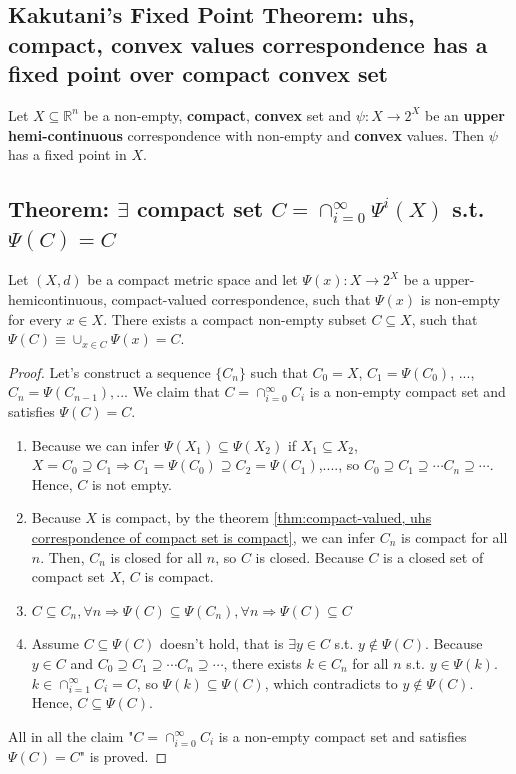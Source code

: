 \documentclass[11pt]{elegantbook}
\begin{document}
\subsection{Kakutani's Fixed Point Theorem: uhs, compact, convex values correspondence has a fixed point over compact convex set}
\begin{theorem}\label{thm:Kakutani's Fixed Point Theorem}
    Let $X \subseteq \mathbb{R}^n$ be a non-empty, \textbf{compact}, \textbf{convex} set and $\psi : X \rightarrow 2^X$ be an \textbf{upper hemi-continuous} correspondence with non-empty and \textbf{convex} values. Then $\psi$ has a fixed point in $X$.
\end{theorem}


\subsection{Theorem: $\exists$ compact set $C = \cap_{i=0}^\infty \Psi^i(X)$ s.t. $\Psi(C)=C$}
\begin{theorem}
    Let $(X, d)$ be a compact metric space and let $\Psi(x) : X \rightarrow 2^X$ be a upper-hemicontinuous, compact-valued correspondence, such that $\Psi(x)$ is non-empty for every $x \in X$. There exists a compact non-empty subset $C\subseteq X$, such that $\Psi(C) \equiv \cup_{x\in C}\Psi(x) = C$.
\end{theorem}
\begin{proof}
    Let's construct a sequence $\{C_n\}$ such that $C_0=X$, $C_1=\Psi(C_0)$, ..., $C_n=\Psi(C_{n-1}),...$ We claim that $C=\cap_{i=0}^\infty C_i$ is a non-empty compact set and satisfies $\Psi(C)=C$.
    \begin{enumerate}
        \item Because we can infer $\Psi(X_1)\subseteq \Psi(X_2)$ if $X_1\subseteq X_2$, $X=C_0\supseteq C_1 \Rightarrow C_1=\Psi(C_0)\supseteq C_2=\Psi(C_1)$,...., so $C_0\supseteq C_1\supseteq \cdots C_n\supseteq \cdots$. Hence, $C$ is not empty.
        \item Because $X$ is compact, by the theorem \ref{thm:compact-valued, uhs correspondence of compact set is compact}, we can infer $C_n$ is compact for all $n$. Then, $C_n$ is closed for all $n$, so $C$ is closed. Because $C$ is a closed set of compact set $X$, $C$ is compact.
        \item $C\subseteq C_n,\forall n \Rightarrow \Psi(C)\subseteq \Psi(C_n),\forall n \Rightarrow \Psi(C)\subseteq C$
        \item Assume $C\subseteq \Psi(C)$ doesn't hold, that is $\exists y\in C$ s.t. $y\notin \Psi(C)$. Because $y\in C$ and $C_0\supseteq C_1\supseteq \cdots C_n\supseteq \cdots$, there exists $k\in C_n$ for all $n$ s.t. $y\in\Psi(k)$. $k\in \cap_{i=1}^\infty C_i=C$, so $\Psi(k)\subseteq \Psi(C)$, which contradicts to $y\notin \Psi(C)$. Hence, $C\subseteq \Psi(C)$.
    \end{enumerate}
    All in all the claim "$C=\cap_{i=0}^\infty C_i$ is a non-empty compact set and satisfies $\Psi(C)=C$" is proved.
\end{proof}
\end{document}
